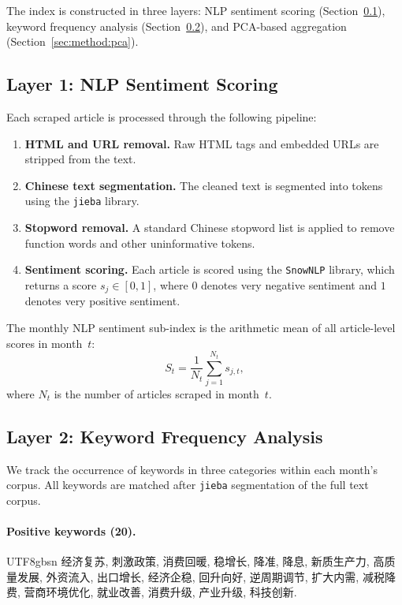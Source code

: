 \documentclass[11pt]{article}
\begin{document}
The index is constructed in three layers: NLP sentiment scoring
(Section~\ref{sec:method:nlp}), keyword frequency analysis
(Section~\ref{sec:method:keyword}), and PCA-based aggregation
(Section~\ref{sec:method:pca}).

\subsection{Layer 1: NLP Sentiment Scoring}\label{sec:method:nlp}

Each scraped article is processed through the following pipeline:

\begin{enumerate}[nosep]
  \item \textbf{HTML and URL removal.}  Raw HTML tags and embedded
    URLs are stripped from the text.
  \item \textbf{Chinese text segmentation.}  The cleaned text is
    segmented into tokens using the \texttt{jieba} library.
  \item \textbf{Stopword removal.}  A standard Chinese stopword list
    is applied to remove function words and other uninformative tokens.
  \item \textbf{Sentiment scoring.}  Each article is scored using the
    \texttt{SnowNLP} library, which returns a score $s_j \in [0,1]$,
    where $0$ denotes very negative sentiment and $1$ denotes very
    positive sentiment.
\end{enumerate}

The monthly NLP sentiment sub-index is the arithmetic mean of all
article-level scores in month~$t$:
\begin{equation}\label{eq:nlp}
  S_t = \frac{1}{N_t} \sum_{j=1}^{N_t} s_{j,t},
\end{equation}
where $N_t$ is the number of articles scraped in month~$t$.

\subsection{Layer 2: Keyword Frequency Analysis}\label{sec:method:keyword}

We track the occurrence of keywords in three categories within each
month's corpus.  All keywords are matched after \texttt{jieba}
segmentation of the full text corpus.

\paragraph{Positive keywords (20).}
\begin{CJK}{UTF8}{gbsn}
经济复苏, 刺激政策, 消费回暖, 稳增长, 降准, 降息, 新质生产力,
高质量发展, 外资流入, 出口增长, 经济企稳, 回升向好, 逆周期调节,
扩大内需, 减税降费, 营商环境优化, 就业改善, 消费升级, 产业升级,
科技创新.
\end{CJK}
\end{document}
